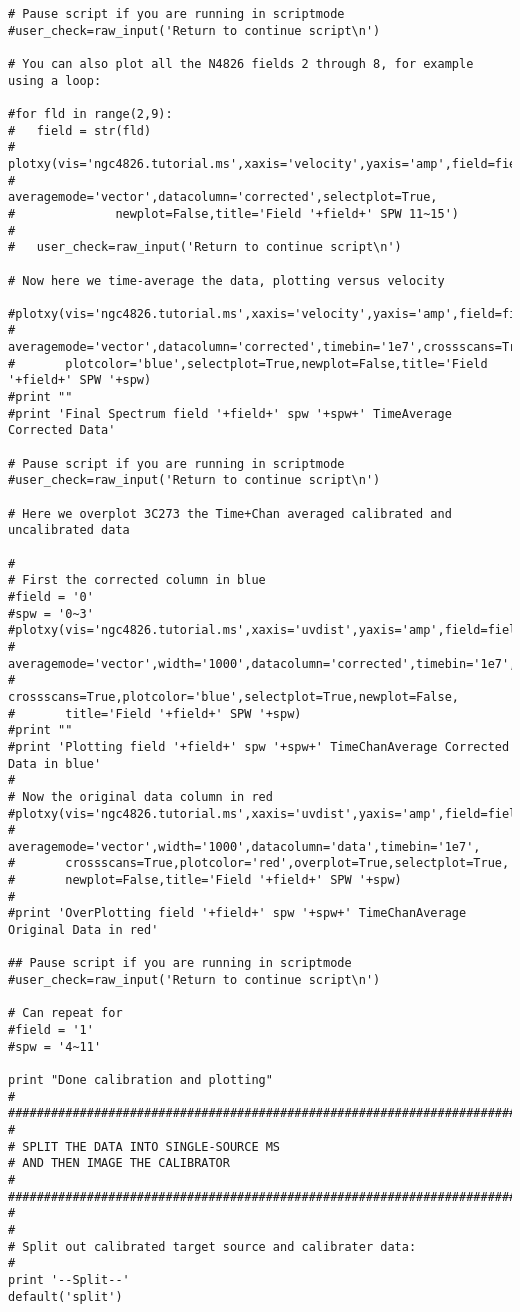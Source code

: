 \begin{verbatim}
# Pause script if you are running in scriptmode
#user_check=raw_input('Return to continue script\n')

# You can also plot all the N4826 fields 2 through 8, for example using a loop:

#for fld in range(2,9):
#	field = str(fld)
#	plotxy(vis='ngc4826.tutorial.ms',xaxis='velocity',yaxis='amp',field=field,spw='11~15',
#              averagemode='vector',datacolumn='corrected',selectplot=True,
#              newplot=False,title='Field '+field+' SPW 11~15')
#	
#	user_check=raw_input('Return to continue script\n')

# Now here we time-average the data, plotting versus velocity

#plotxy(vis='ngc4826.tutorial.ms',xaxis='velocity',yaxis='amp',field=field,spw=spw,
#       averagemode='vector',datacolumn='corrected',timebin='1e7',crossscans=True,
#       plotcolor='blue',selectplot=True,newplot=False,title='Field '+field+' SPW '+spw)
#print ""
#print 'Final Spectrum field '+field+' spw '+spw+' TimeAverage Corrected Data'
	
# Pause script if you are running in scriptmode
#user_check=raw_input('Return to continue script\n')

# Here we overplot 3C273 the Time+Chan averaged calibrated and uncalibrated data

#
# First the corrected column in blue
#field = '0'
#spw = '0~3'
#plotxy(vis='ngc4826.tutorial.ms',xaxis='uvdist',yaxis='amp',field=field,spw=spw,
#       averagemode='vector',width='1000',datacolumn='corrected',timebin='1e7',
#       crossscans=True,plotcolor='blue',selectplot=True,newplot=False,
#       title='Field '+field+' SPW '+spw)
#print ""
#print 'Plotting field '+field+' spw '+spw+' TimeChanAverage Corrected Data in blue'
#
# Now the original data column in red
#plotxy(vis='ngc4826.tutorial.ms',xaxis='uvdist',yaxis='amp',field=field,spw=spw,
#       averagemode='vector',width='1000',datacolumn='data',timebin='1e7',
#       crossscans=True,plotcolor='red',overplot=True,selectplot=True,
#       newplot=False,title='Field '+field+' SPW '+spw)
#
#print 'OverPlotting field '+field+' spw '+spw+' TimeChanAverage Original Data in red'
	
## Pause script if you are running in scriptmode
#user_check=raw_input('Return to continue script\n')

# Can repeat for
#field = '1'
#spw = '4~11'

print "Done calibration and plotting"
#
##########################################################################
#
# SPLIT THE DATA INTO SINGLE-SOURCE MS
# AND THEN IMAGE THE CALIBRATOR
#
##########################################################################
#
#
# Split out calibrated target source and calibrater data:
#
print '--Split--'
default('split')


\end{verbatim}
